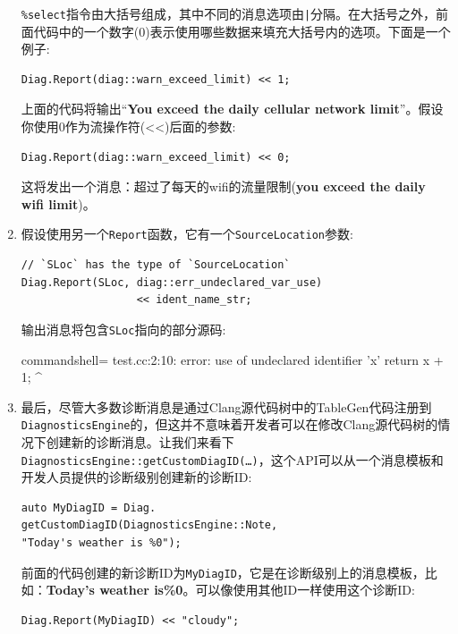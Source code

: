 \begin{enumerate}
\texttt{\%select}指令由大括号组成，其中不同的消息选项由\texttt{|}分隔。在大括号之外，前面代码中的一个数字(0)表示使用哪些数据来填充大括号内的选项。下面是一个例子:

\begin{lstlisting}[style=styleJavaScript]
Diag.Report(diag::warn_exceed_limit) << 1;
\end{lstlisting}

上面的代码将输出“\textbf{You exceed the daily cellular network limit}”。假设你使用0作为流操作符(<<)后面的参数:

\begin{lstlisting}[style=styleJavaScript]
Diag.Report(diag::warn_exceed_limit) << 0;
\end{lstlisting}

这将发出一个消息：超过了每天的wifi的流量限制(\textbf{you exceed the daily wifi limit})。

\item 假设使用另一个\texttt{Report}函数，它有一个\texttt{SourceLocation}参数:

\begin{lstlisting}[style=styleJavaScript]
// `SLoc` has the type of `SourceLocation`
Diag.Report(SLoc, diag::err_undeclared_var_use)
                  << ident_name_str;
\end{lstlisting}

输出消息将包含\texttt{SLoc}指向的部分源码:

\begin{tcblisting}{commandshell={}}
test.cc:2:10: error: use of undeclared identifier 'x'
  return x + 1;
          ^
\end{tcblisting}

\item 最后，尽管大多数诊断消息是通过Clang源代码树中的TableGen代码注册到\texttt{DiagnosticsEngine}的，但这并不意味着开发者可以在修改Clang源代码树的情况下创建新的诊断消息。让我们来看下\texttt{DiagnosticsEngine::getCustomDiagID(…)}，这个API可以从一个消息模板和开发人员提供的诊断级别创建新的诊断ID:

\begin{lstlisting}[style=styleJavaScript]
auto MyDiagID = Diag.
getCustomDiagID(DiagnosticsEngine::Note,
"Today's weather is %0");
\end{lstlisting}

前面的代码创建的新诊断ID为\texttt{MyDiagID}，它是在诊断级别上的消息模板，比如：\textbf{Today's weather is\%0}。可以像使用其他ID一样使用这个诊断ID:

\begin{lstlisting}[style=styleJavaScript]
Diag.Report(MyDiagID) << "cloudy";
\end{lstlisting}

\end{enumerate}

